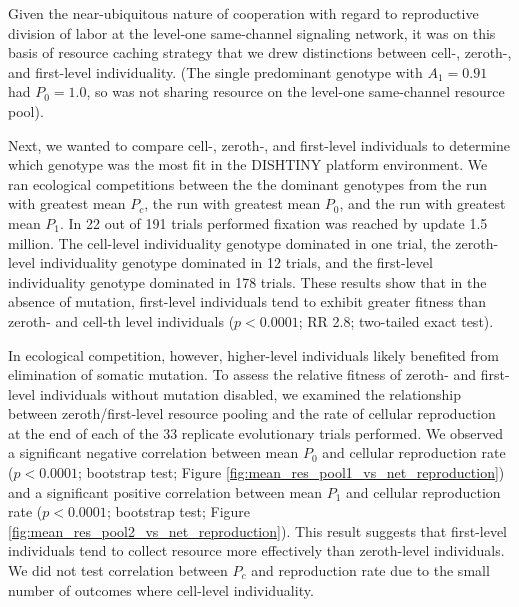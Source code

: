 Given the near-ubiquitous nature of cooperation with regard to reproductive division of labor at the level-one same-channel signaling network, it was on this basis of resource caching strategy that we drew distinctions between cell-, zeroth-, and first-level individuality.
(The single predominant genotype with $A_1 = 0.91$ had $P_0 = 1.0$, so was not sharing resource on the level-one same-channel resource pool).

Next, we wanted to compare cell-, zeroth-, and first-level individuals to determine which genotype was the most fit in the DISHTINY platform environment.
We ran ecological competitions between the the dominant genotypes from the run with greatest mean $P_{c}$, the run with greatest mean $P_0$, and the run with greatest mean $P_1$.
In 22 out of 191 trials performed fixation was reached by update 1.5 million.  The cell-level individuality genotype dominated in one trial, the zeroth-level individuality genotype dominated in 12 trials, and the first-level individuality genotype dominated in 178 trials.
These results show that in the absence of mutation, first-level individuals tend to exhibit greater fitness than zeroth- and cell-th level individuals ($p < 0.0001$; RR 2.8; two-tailed exact test).

In ecological competition, however, higher-level individuals likely benefited from elimination of somatic mutation.
To assess the relative fitness of zeroth- and first-level individuals without mutation disabled, we examined the relationship between zeroth/first-level resource pooling and the rate of cellular reproduction at the end of each of the 33 replicate evolutionary trials performed.
We observed a significant negative correlation between mean $P_0$ and cellular reproduction rate ($p < 0.0001$; bootstrap test; Figure \ref{fig:mean_res_pool1_vs_net_reproduction}) and a significant positive correlation between mean $P_1$ and cellular reproduction rate ($p < 0.0001$; bootstrap test; Figure \ref{fig:mean_res_pool2_vs_net_reproduction}).
This result suggests that first-level individuals tend to collect resource more effectively than zeroth-level individuals.
We did not test correlation between $P_{c}$ and reproduction rate due to the small number of outcomes where cell-level individuality.

